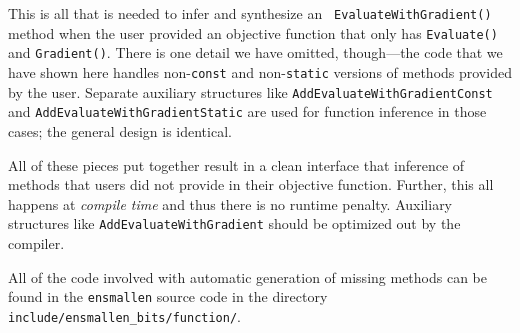 This is all that is needed to infer and synthesize an {\tt
EvaluateWithGradient()} method when the user provided an objective function that
only has {\tt Evaluate()} and {\tt Gradient()}.  There is one detail we have
omitted, though---the code that we have shown here handles non-{\tt const}
and non-{\tt static} versions of methods provided by the user.  Separate
auxiliary structures like {\tt AddEvaluateWithGradientConst}
and {\tt AddEvaluateWithGradientStatic}
are used for function inference in those cases; the general design is identical.

All of these pieces put together result in a clean interface that inference of
methods that users did not provide in their objective function.  Further, this
all happens at {\it compile time} and thus there is no runtime penalty.
Auxiliary structures like {\tt AddEvaluateWithGradient} should be optimized out
by the compiler.

All of the code involved with automatic generation of missing methods can be
found in the {\tt ensmallen} source code in the directory {\tt
include/ensmallen\_bits/function/}.
